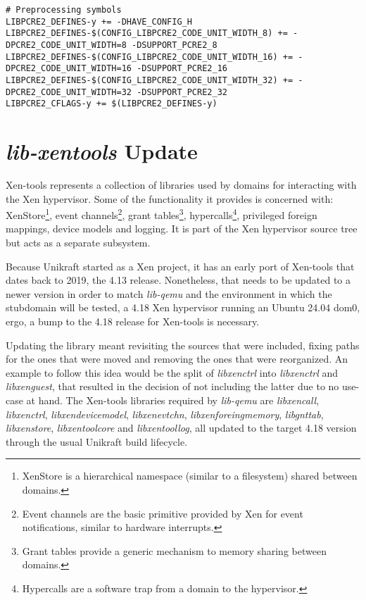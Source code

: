 \begin{lstlisting}
# Preprocessing symbols
LIBPCRE2_DEFINES-y += -DHAVE_CONFIG_H
LIBPCRE2_DEFINES-$(CONFIG_LIBPCRE2_CODE_UNIT_WIDTH_8) += -DPCRE2_CODE_UNIT_WIDTH=8 -DSUPPORT_PCRE2_8
LIBPCRE2_DEFINES-$(CONFIG_LIBPCRE2_CODE_UNIT_WIDTH_16) += -DPCRE2_CODE_UNIT_WIDTH=16 -DSUPPORT_PCRE2_16
LIBPCRE2_DEFINES-$(CONFIG_LIBPCRE2_CODE_UNIT_WIDTH_32) += -DPCRE2_CODE_UNIT_WIDTH=32 -DSUPPORT_PCRE2_32
LIBPCRE2_CFLAGS-y += $(LIBPCRE2_DEFINES-y)
\end{lstlisting}

\section{\textit{lib-xentools} Update}

Xen-tools \cite{xen-tools} represents a collection of libraries used by domains for interacting with the Xen hypervisor.
Some of the functionality it provides is concerned with: XenStore\footnote{XenStore is a hierarchical namespace (similar to a filesystem) shared between domains.}, event channels\footnote{Event channels are the basic primitive provided by Xen for event notifications, similar to hardware interrupts.}, grant tables\footnote{Grant tables provide a generic mechanism to memory sharing between domains.}, hypercalls\footnote{Hypercalls are a software trap from a domain to the hypervisor.}, privileged foreign mappings, device models and logging.
It is part of the Xen hypervisor source tree \cite{xen-source-tree} but acts as a separate subsystem.

Because Unikraft started as a Xen project, it has an early port of Xen-tools that dates back to 2019, the 4.13 release.
Nonetheless, that needs to be updated to a newer version in order to match \textit{lib-qemu} and the environment in which the stubdomain will be tested, a 4.18 Xen hypervisor running an Ubuntu 24.04 dom0, ergo, a bump to the 4.18 release for Xen-tools is necessary.

Updating the library meant revisiting the sources that were included, fixing paths for the ones that were moved and removing the ones that were reorganized.
An example to follow this idea would be the split of \textit{libxenctrl} into \textit{libxenctrl} and \textit{libxenguest}, that resulted in the decision of not including the latter due to no use-case at hand.
The Xen-tools libraries required by \textit{lib-qemu} are \textit{libxencall}, \textit{libxenctrl}, \textit{libxendevicemodel}, \textit{libxenevtchn}, \textit{libxenforeingmemory}, \textit{libgnttab}, \textit{libxenstore}, \textit{libxentoolcore} and \textit{libxentoollog}, all updated to the target 4.18 version through the usual Unikraft build lifecycle.
